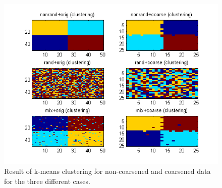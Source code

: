 \documentclass[12pt]{article}
\begin{document}
\begin{figure}[p]
\includegraphics{Fig3.png}
\caption{Result of k-means clustering for non-coarsened and coarsened data for
the three different cases.}
\end{figure}
\end{document}
